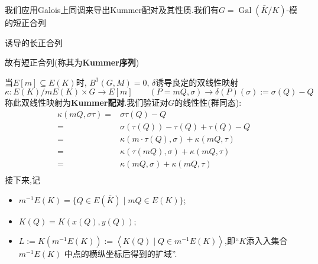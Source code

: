 \documentclass[12pt,A4paper,oneside,reqno]{amsart}
\numberwithin{equation}{section}
\theoremstyle{definition}
\theoremstyle{plain}
\theoremstyle{plain}
\numberwithin{equation}{section}
\theoremstyle{remark}
\newcommand{\Gal}{\operatorname{Gal}}
\begin{document}
我们应用Galois上同调来导出Kummer配对及其性质.我们有$G=\Gal(\bar{K}/K)$-模的短正合列
	\begin{center}
	\end{center}
诱导的长正合列
	\begin{center}
	\end{center}
故有短正合列(称其为\textbf{Kummer序列})
	\begin{center}
	\end{center}
当$E[m] \subseteq E(K)$时, $B^1(G,M)=0$, $\delta$诱导良定的双线性映射
$$ \kappa : E(K)/mE(K) \times G \longrightarrow E[m] \qquad (P\!\!=\!\!mQ, \sigma) \longrightarrow \delta(P)(\sigma):=\sigma(Q)-Q$$
称此双线性映射为\textbf{Kummer配对}.我们验证对$G$的线性性(群同态):
\begin{equation*}
\begin{aligned}
\kappa(mQ,\sigma\tau)=&\sigma\tau(Q)-Q\\
=& \sigma(\tau(Q))-\tau(Q)+\tau(Q)-Q\\
=& \kappa(m \cdot\tau(Q),\sigma)+\kappa(mQ, \tau)\\
=& \kappa(\tau(mQ),\sigma)+\kappa(mQ, \tau)\\
=& \kappa(mQ,\sigma)+\kappa(mQ, \tau)\\
\end{aligned}
\end{equation*}
接下来,记
\begin{itemize}
	\item $m^{-1}E(K)=\{Q \in E(\bar{K}) \mid mQ \in E(K)\}$;
	\item $K(Q)=K(x(Q),y(Q))$;
	\item $L:=K(m^{-1}E(K)):=\left<K(Q) \mid Q \in m^{-1}E(K) \right>$,即“$K$添入入集合 $m^{-1}E(K)$ 中点的横纵坐标后得到的扩域”.
\end{itemize}
\end{document}
